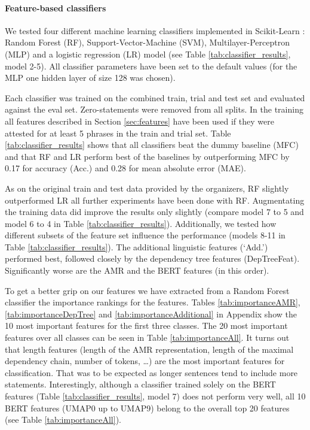 \documentclass[11pt]{article}
\begin{document}
\paragraph{Feature-based classifiers} We tested four different machine learning classifiers implemented in Scikit-Learn \cite{pedregosa2011scikit}: Random Forest (RF), Support-Vector-Machine (SVM), Multilayer-Perceptron (MLP) and a logistic regression (LR) model (see Table \ref{tab:classifier_results}, model 2-5). All classifier parameters have been set to the default values (for the MLP one hidden layer of size 128 was chosen).

Each classifier was trained on the combined train, trial and test set and evaluated against the eval set. Zero-statements were removed from all splits. In the training all features described in Section \ref{sec:features}  have been used if they were attested for at least 5 phrases in the train and trial set. Table \ref{tab:classifier_results} shows that 
all classifiers beat the dummy baseline (MFC) 
and that RF and LR perform best of the baselines by outperforming MFC by 0.17 for accuracy (Acc.) and 0.28 for mean absolute error (MAE).  

As on the original train and test data provided by the organizers, RF slightly outperformed LR all further experiments have been done with RF.
Augmentating the training data did improve the results only slightly (compare model 7 to 5 and model 6 to 4 in Table \ref{tab:classifier_results}). 
Additionally, we tested how different subsets of the feature set influence the performance (models 8-11 in Table \ref{tab:classifier_results}). The additional linguistic features (`Add.') performed best, followed closely by the dependency tree features (DepTreeFeat). Significantly worse are the AMR and the BERT features (in this order).

To get a better grip on our features we have extracted from a Random Forest classifier the importance rankings for the features. Tables \ref{tab:importanceAMR}, \ref{tab:importanceDepTree} and \ref{tab:importanceAdditional} in Appendix show the 10 most important features for the first three classes. The 20 most important features over all classes can be seen in Table \ref{tab:importanceAll}. It turns out that length features (length of the AMR representation, length of the maximal dependency chain, number of tokens, \ldots) are the most important features for classification. That was to be expected as longer sentences tend to include more statements. Interestingly, although a classifier trained solely on the BERT features (Table \ref{tab:classifier_results}, model 7) does not perform very well, all 10 BERT features (UMAP0 up to UMAP9) belong to the overall top 20 features (see Table \ref{tab:importanceAll}).
\end{document}
